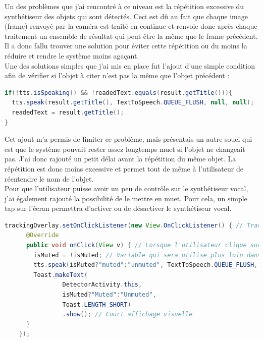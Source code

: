 \documentclass[UTF8]{EPURapport}
\begin{document}
Un des problèmes que j'ai rencontré à ce niveau est la répétition excessive du synthétiseur des objets qui sont détectés. Ceci est dû au fait que chaque image (frame) renvoyé par la caméra est traité en continue et renvoie donc après chaque traitement un ensemble de résultat qui peut être la même que le frame précédent. Il a donc fallu trouver une solution pour éviter cette répétition ou du moins la réduire et rendre le système moins agaçant.\\

Une des solutions simples que j'ai mis en place fut l'ajout d'une simple condition afin de vérifier si l'objet à citer n'est pas la même que l'objet précédent :\\

\begin{lstlisting}[language=Java]
if(!tts.isSpeaking() && !readedText.equals(result.getTitle())){
  tts.speak(result.getTitle(), TextToSpeech.QUEUE_FLUSH, null, null);
  readedText = result.getTitle();
}
\end{lstlisting}

Cet ajout m'a permis de limiter ce problème, mais présentais un autre souci qui est que le système pouvait rester assez longtemps muet si l'objet ne changeait pas. J'ai donc rajouté un petit délai avant la répétition du même objet. La répétition est donc moins excessive et permet tout de même à l'utilisateur de réentendre le nom de l'objet.\\

Pour que l'utilisateur puisse avoir un peu de contrôle sur le synthétiseur vocal, j'ai également rajouté la possibilité de le mettre en muet. Pour cela, un simple tap sur l'écran permettra d'activer ou de désactiver le synthétiseur vocal.\\

\begin{lstlisting}[language=Java]
trackingOverlay.setOnClickListener(new View.OnClickListener() { // TrackingOverlay est la vue affiche sur l'activite principale de l'application
      @Override
      public void onClick(View v) { // Lorsque l'utilisateur clique sur l'ecran
        isMuted = !isMuted; // Variable qui sera utilise plus loin dans le code qui desactivera le synthetiseur vocal
        tts.speak(isMuted?"muted":"unmuted", TextToSpeech.QUEUE_FLUSH, null, null); // On indique que le synthetiseur va etre desactive/active
        Toast.makeText(
                DetectorActivity.this,
                isMuted?"Muted":"Unmuted",
                Toast.LENGTH_SHORT)
                .show(); // Court affichage visuelle
      }
    });
\end{lstlisting}
\end{document}
